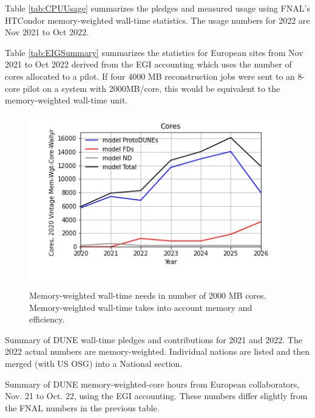 \documentclass[12pt]{article}
\begin{document}
Table \ref{tab:CPUUsage} summarizes the pledges\cite{CCB2022} and measured usage using FNAL's  HTCondor memory-weighted wall-time statistics\cite{fifemonDUNE}.  The  usage numbers for 2022 are Nov 2021 to Oct 2022. 

Table \ref{tab:EIGSummary} summarizes the statistics for European sites from Nov 2021 to Oct 2022 derived from the EGI accounting\cite{EGI2022} which uses the number of cores allocated to a pilot.   If four 4000 MB reconstruction jobs were sent to an 8-core pilot on a system with 2000MB/core, this would be equivalent to the memory-weighted wall-time unit.   

\begin{figure}[h]
\centering\includegraphics[height=0.4\textwidth]{Parameters_2022-11-21-2026/Parameters_2022-11-21-2026-Cores.png}
\caption{Memory-weighted wall-time needs in number of 2000 MB cores. Memory-weighted  wall-time takes into account memory and efficiency.}\label{fig:CoresMain}
\end{figure}

\begin{table}[ht]
\centering{}
\caption{Summary  of DUNE wall-time pledges and contributions for 2021 and 2022.  The 2022 actual numbers are memory-weighted.  Individual nations are listed and then merged (with US OSG) into a National section.} 
\label{tab:CPUUsage}
\end{table}

\begin{table}[ht]
\centering{}
\caption{Summary  of DUNE memory-weighted-core hours from European collaborators, Nov. 21 to Oct. 22, using the EGI accounting\cite{EGI2022}. These numbers differ slightly from the FNAL numbers in the previous table.} \label{tab:EIGSummary}
\end{table}
\end{document}
